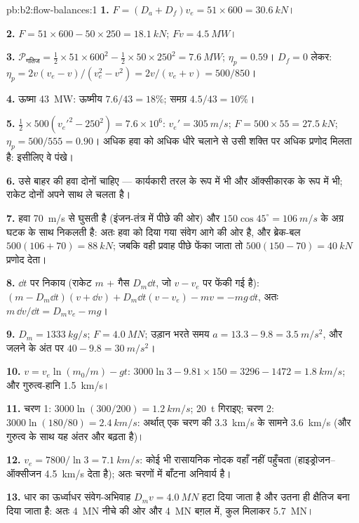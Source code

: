 \begin{solution}{pb:b2:flow-balances:1}
\textbf{1.} $F = (D_a + D_f)v_e = 51 \times 600 = \qty{30.6}{kN}$।

\textbf{2.} $F = 51 \times 600 - 50 \times 250 = \qty{18.1}{kN}$; $Fv = \qty{4.5}{MW}$।

\textbf{3.} $\mathcal P_{\text{गतिज}} = \tfrac12 \times 51 \times 600^2 - \tfrac12 \times 50 \times 250^2 =
\qty{7.6}{MW}$; $\eta_p = 0.59$। $D_f = 0$ लेकर: $\eta_p = 2v(v_e - v)/(v_e^2 - v^2)
= 2v/(v_e + v) = 500/850$।

\textbf{4.} ऊष्मा \qty{43}{MW}: ऊष्मीय $7.6/43 = 18\%$; समग्र $4.5/43 = 10\%$।

\textbf{5.} $\tfrac12 \times 500(v_e'^2 - 250^2) = 7.6 \times 10^6$: $v_e' = \qty{305}{m/s}$;
$F = 500 \times 55 = \qty{27.5}{kN}$; $\eta_p = 500/555 = 0.90$। अधिक हवा को अधिक
धीरे चलाने से उसी शक्ति पर अधिक प्रणोद मिलता है: इसीलिए वे पंखे।

\textbf{6.} उसे बाहर की हवा दोनों चाहिए --- कार्यकारी तरल के रूप में भी और
ऑक्सीकारक के रूप में भी; राकेट दोनों अपने साथ ले चलता है।

\textbf{7.} हवा \qty{70}{m/s} से घुसती है (इंजन-तंत्र में पीछे की ओर)
और $150\cos45^\circ = \qty{106}{m/s}$ के अग्र घटक के साथ निकलती है: अतः
हवा को दिया गया संवेग आगे की ओर है, और ब्रेक-बल $500(106 + 70) = \qty{88}{kN}$;
जबकि वही प्रवाह पीछे फेंका जाता तो $500(150 - 70) =
\qty{40}{kN}$ प्रणोद देता।

\textbf{8.} $\dd t$ पर निकाय (राकेट $m$ + गैस $D_m\dd t$, जो
$v - v_e$ पर फेंकी गई है): $(m - D_m\dd t)(v + \dd v) + D_m\dd t(v - v_e) - mv = -mg\,\dd t$,
अतः $m\,\dd v/\dd t = D_mv_e - mg$।

\textbf{9.} $D_m = \qty{1333}{kg/s}$; $F = \qty{4.0}{MN}$; उड़ान भरते समय $a = 13.3 - 9.8 =
\qty{3.5}{m/s^2}$, और जलने के अंत पर $40 - 9.8 = \qty{30}{m/s^2}$।

\textbf{10.} $v = v_e\ln(m_0/m) - gt$: $3000\ln3 - 9.81 \times 150 = 3296 - 1472 =
\qty{1.8}{km/s}$; और गुरुत्व-हानि \qty{1.5}{km/s}।

\textbf{11.} चरण 1: $3000\ln(300/200) = \qty{1.2}{km/s}$; \qty{20}{t} गिराइए; चरण
2: $3000\ln(180/80) = \qty{2.4}{km/s}$: अर्थात् एक चरण की \qty{3.3}{km/s} के सामने
\qty{3.6}{km/s} (और गुरुत्व के साथ यह अंतर और बढ़ता है)।

\textbf{12.} $v_e = 7800/\ln3 = \qty{7.1}{km/s}$: कोई भी रासायनिक नोदक
वहाँ नहीं पहुँचता (हाइड्रोजन--ऑक्सीजन \qty{4.5}{km/s} देता है); अतः चरणों में बाँटना अनिवार्य है।

\textbf{13.} धार का ऊर्ध्वाधर संवेग-अभिवाह $D_mv = \qty{4.0}{MN}$ हटा दिया
जाता है और उतना ही क्षैतिज बना दिया जाता है: अतः \qty{4}{MN} नीचे की ओर
और \qty{4}{MN} बग़ल में, कुल मिलाकर \qty{5.7}{MN}।


\end{solution}
